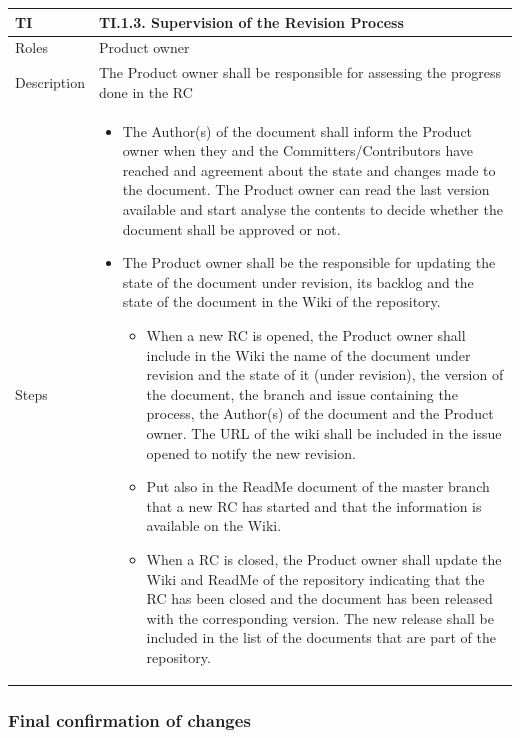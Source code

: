 \documentclass{template/openetcs_article}
\begin{document}
\begin{flushleft}
\tablefirsthead{}
\tablehead{}
\tabletail{}
\tablelasttail{}
\begin{supertabular}{|m{2cm}|m{13cm}|}
\hline
{}
TI & 
TI.1.3. Supervision of the Revision Process
\\\hline
Roles &
Product owner
\\\hline
Description &
The Product owner shall be responsible for assessing the progress done in the RC
\\\hline
Steps &
\begin{itemize}
\item The Author(s) of the document shall inform the Product owner when they and the Committers/Contributors have reached and agreement about the state and changes made to the document. The Product owner can read the last version available and start analyse the contents to decide whether the document shall be approved or not.
\item The Product owner shall be the responsible for updating the state of the document under revision, its backlog and the state of the document in the Wiki of the repository. 
\begin{itemize}
\item When a new RC is opened, the Product owner shall include in the Wiki the name of the document under revision and the state of it (under revision), the version of the document, the branch and issue containing the process, the Author(s) of the document and the Product owner. The URL of the wiki shall be included in the issue opened to notify the new revision.
\item Put also in the ReadMe document of the master branch that a new RC has started and that the information is available on the Wiki.
\item When a RC is closed, the Product owner shall update the Wiki and ReadMe of the repository indicating that the RC has been closed and the document has been released with the corresponding version. The new release shall be included in the list of the documents that are part of the repository.
\end{itemize}
\end{itemize}
\\\hline
\end{supertabular}
\end{flushleft}


\subsubsection{Final confirmation of changes}
\end{document}
